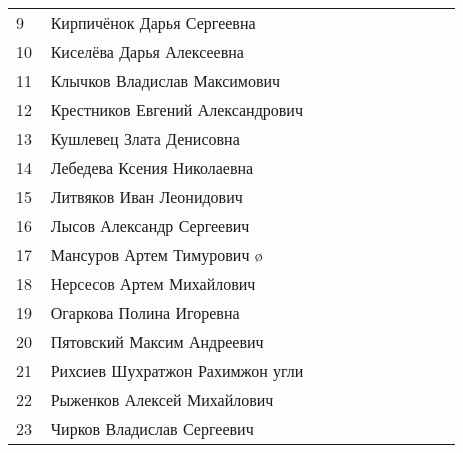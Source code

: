 \documentclass[a4paper,landscape,11pt]{article}
\newcommand*\ok{&{\small \ding{51}}} %
\newcommand*\no{&{\small }} %
\begin{document}
\begin{tabular}{p{7pt}|l|p{\CS}|p{\CS}|p{\CS}|p{\CS}|p{\CS}|p{\CS}|p{\CS}|p{\CS}|p{\CS}}
9\,&  Кирпичёнок Дарья Сергеевна       \ok\no\ok\ok\ok\no&&\\ 
10\,& Киселёва Дарья Алексеевна        \ok\ok\ok\ok\no\ok&&\\
\midrule
11\,& Клычков Владислав Максимович     \ok\no\ok\ok\ok\ok&&\\
12\,& Крестников Евгений Александрович \ok\ok\ok\ok\no\ok&&\\
13\,& Кушлевец Злата Денисовна         \ok\ok\ok\no\ok\no&&\\
14\,& Лебедева Ксения Николаевна       \ok\ok\ok\ok\ok\no&&\\
15\,& Литвяков Иван Леонидович         \ok\ok\ok\ok\ok\ok&&\\
\midrule
16\,& Лыс{о}в Александр Сергеевич        \ok\ok\ok\no\ok\ok&&\\
17\,& Мансуров Артем Тимурович         \o\ok\ok\no\ok\ok&&\\
18\,& Нерсесов Артем Михайлович        \ok\ok\ok\ok\ok\ok&&\\ 
19\,& Огаркова Полина Игоревна         \ok\ok\ok\ok\ok\ok&&\\
20\,& Пятовский Максим Андреевич       \ok\ok\ok\no\ok\no&&\\
\midrule
21\,& Рихсиев Шухратжон Рахимжон угли  \ok\ok\ok\no\no\ok&&\\
22\,& Рыженков Алексей Михайлович      \ok\ok\ok\no\ok\no&&\\
23\,& Чирков Владислав Сергеевич       \ok\ok\ok\ok\ok\ok&&\\
\bottomrule
\end{tabular} 
\end{document}
